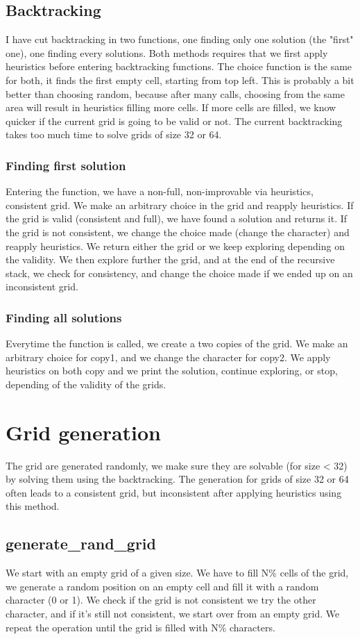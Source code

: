 \documentclass{article}
\begin{document}
\subsection{Backtracking}
I have cut backtracking in two functions, one finding only one solution (the "first" one), one finding every solutions. Both methods requires that we first apply heuristics before entering backtracking functions. The choice function is the same for both, it finds the first empty cell, starting from top left. This is probably a bit better than choosing random, because after many calls, choosing from the same area will result in heuristics filling more cells. If more cells are filled, we know quicker if the current grid is going to be valid or not. The current backtracking takes too much time to solve grids of size 32 or 64.
\subsubsection{Finding first solution}
Entering the function, we have a non-full, non-improvable via heuristics, consistent grid. We make an arbitrary choice in the grid and reapply heuristics. If the grid is valid (consistent and full), we have found a solution and returns it. If the grid is not consistent, we change the choice made (change the character) and reapply heuristics. We return either the grid or we keep exploring depending on the validity. We then explore further the grid, and at the end of the recursive stack, we check for consistency, and change the choice made if we ended up on an inconsistent grid.
\subsubsection{Finding all solutions}
Everytime the function is called, we create a two copies of the grid. We make an arbitrary choice for copy1, and we change the character for copy2. We apply heuristics on both copy and we print the solution, continue exploring, or stop, depending of the validity of the grids.    
\section{Grid generation}
The grid are generated randomly, we make sure they are solvable (for size < 32) by solving them using the backtracking. The generation for grids of size 32 or 64 often leads to a consistent grid, but inconsistent after applying heuristics using this method.
\subsection{generate\_rand\_grid}
We start with an empty grid of a given size. We have to fill N\% cells of the grid, we generate a random position on an empty cell and fill it with a random character (0 or 1). We check if the grid is not consistent we try the other character, and if it's still not consistent, we start over from an empty grid. We repeat the operation until the grid is filled with N\% characters.
\end{document}

